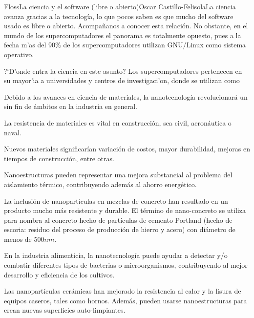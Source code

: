 \begin{article}[2]{Floss}{La ciencia y el software (libre o abierto)}{Oscar Castillo-Felisola}{La ciencia avanza gracias a la tecnolog\'ia, lo que pocos saben es que mucho del software usado es libre o abierto. Acompa\~nanos a conocer esta relaci\'on.}
No obstante, en el mundo de los supercomputadores el panorama es totalmente opuesto, pues a la fecha m'as del 90\% de los supercomputadores utilizan GNU/Linux como sistema operativo.


?`D'onde entra la ciencia en este asunto? Los supercomputadores pertenecen en su mayor'ia a universidades y centros de investigaci'on, donde se utilizan como 


Debido a los avances en ciencia de materiales, la nanotecnolog\'ia revolucionar\'a un sin fin de \'ambitos en la industria en general.

La resistencia de materiales es vital en construcci\'on, sea civil, aeron\'autica o naval. 

Nuevos materiales significar\'ian variaci\'on de costos, mayor durabilidad, mejoras en tiempos de construcci\'on, entre otras.

Nanoestructuras pueden representar una mejora substancial al problema del aislamiento t\'ermico, contribuyendo adem\'as al ahorro energ\'etico.

La inclusi\'on de nanopart\'iculas en mezclas de concreto han resultado en un producto mucho m\'as resistente y durable. El t\'ermino de nano-concreto se utiliza para nombra al concreto hecho de part\'iculas de cemento Portland (hecho de escoria: residuo del proceso de producci\'on de hierro y acero) con di\'ametro de menos de $500 n m$.


En la industria alimenticia, la nanotecnolog\'ia puede ayudar a detectar y/o combatir diferentes tipos de bacterias o microorganismos, contribuyendo al mejor desarrollo y eficiencia de los cultivos.

Las nanopart\'iculas cer\'amicas han mejorado la resistencia al calor y la lisura de equipos caseros, tales como hornos. Adem\'as, pueden usarse nanoestructuras para crean nuevas superficies auto-limpiantes.


\end{article}
